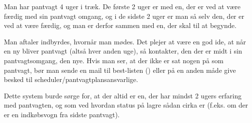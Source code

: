 Man har pantvagt 4 uger i træk. De første 2 uger er med en, der er ved
at være færdig med sin pantvagt omgang, og i de sidste 2 uger er man
så selv den, der er ved at være færdig, og man er derfor sammen med
en, der skal til at begynde.

Man aftaler indbyrdes, hvornår man mødes. Det plejer at være en god
ide, at når en ny bliver pantvagt (altså hver anden uge), så
kontakter, den der er midt i sin pantvagtsomgang, den nye. Hvis man
ser, at der ikke er sat nogen på som pantvagt, bør man sende en mail
til best-listen () eller på en anden måde
give besked til scheduler/pantvagtplansansvarlige.

Dette system burde sørge for, at der altid er en, der har mindst 2
ugers erfaring med pantvagten, og som ved hvordan status på lagre
sådan cirka er (f.eks. om der er en indkøbsvogn fra sidste pantvagt).



